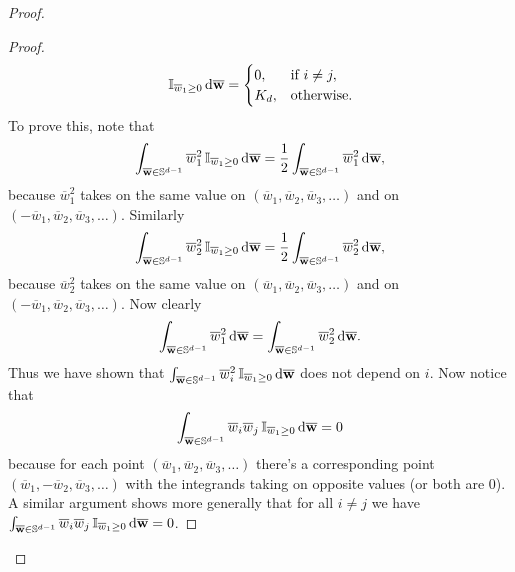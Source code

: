 \begin{proof}
\begin{proof}
\begin{align*}
			\,\mathbb{I}_{\overline{w}_1 \ge 0}  \,\mathrm{d} \overline{\mathbf{w}} 
			= \begin{cases} 
				0, & \text{if } i \neq j, \\
				K_d, & \text{otherwise.}
			\end{cases}
		\end{align*}
		To prove this, note that 
		\begin{align*}
			\int_{\overline{\mathbf{w}} \in \mathbb{S}^{d-1}} \overline{w}_1^2 \,\mathbb{I}_{\overline{w}_1 \ge 0}  \,\mathrm{d} \overline{\mathbf{w}}
			= \frac{1}{2}\int_{\overline{\mathbf{w}} \in \mathbb{S}^{d-1}} \overline{w}_1^2   \,\mathrm{d} \overline{\mathbf{w}},
		\end{align*}
		because $\overline{w}_1^2$ takes on the same value on $(\overline{w}_1, \overline{w}_2, \overline{w}_3, \ldots)$ and on $(-\overline{w}_1, \overline{w}_2, \overline{w}_3, \ldots)$.
		Similarly
		\begin{align*}
			\int_{\overline{\mathbf{w}} \in \mathbb{S}^{d-1}} \overline{w}_2^2 \,\mathbb{I}_{\overline{w}_1 \ge 0}  \,\mathrm{d} \overline{\mathbf{w}}
			= \frac{1}{2}\int_{\overline{\mathbf{w}} \in \mathbb{S}^{d-1}} \overline{w}_2^2   \,\mathrm{d} \overline{\mathbf{w}},
		\end{align*}
		because $\overline{w}_2^2$ takes on the same value on $(\overline{w}_1, \overline{w}_2, \overline{w}_3, \ldots)$ and on $(-\overline{w}_1, \overline{w}_2, \overline{w}_3, \ldots)$.
		Now clearly 
		\begin{align*}
			\int_{\overline{\mathbf{w}} \in \mathbb{S}^{d-1}} \overline{w}_1^2   \,\mathrm{d} \overline{\mathbf{w}}= 
			\int_{\overline{\mathbf{w}} \in \mathbb{S}^{d-1}} \overline{w}_2^2   \,\mathrm{d} \overline{\mathbf{w}}.
		\end{align*}
		Thus we have shown that $\int_{\overline{\mathbf{w}} \in \mathbb{S}^{d-1}} \overline{w}_i^2 \,\mathbb{I}_{\overline{w}_1 \ge 0}  \,\mathrm{d} \overline{\mathbf{w}}$ does not depend on $i$. 
		Now notice that  
		\begin{align*}
			\int_{\overline{\mathbf{w}} \in \mathbb{S}^{d-1}} \overline{w}_i \overline{w}_j \,\mathbb{I}_{\overline{w}_1 \ge 0}  \,\mathrm{d} \overline{\mathbf{w}} = 0
		\end{align*}
		because for each point $(\overline{w}_1, \overline{w}_2, \overline{w}_3, \ldots)$ there's a corresponding point $(\overline{w}_1, -\overline{w}_2, \overline{w}_3, \ldots)$ 
		with the integrands taking on opposite values (or both are $0$). A similar argument shows more generally that for all $i \neq j$ we have $\int_{\overline{\mathbf{w}} \in \mathbb{S}^{d-1}} \overline{w}_i \overline{w}_j
		\,\mathbb{I}_{\overline{w}_1 \ge 0}  \,\mathrm{d} \overline{\mathbf{w}} = 0$. 
	\end{proof}
	

\end{proof}
